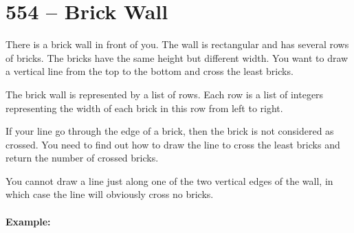 \section{554 -- Brick Wall}

There is a brick wall in front of you. The wall is rectangular and has several rows of bricks. The bricks have the same height but different width. You want to draw a vertical line from the top to the bottom and cross the least bricks.

The brick wall is represented by a list of rows. Each row is a list of integers representing the width of each brick in this row from left to right.

If your line go through the edge of a brick, then the brick is not considered as crossed. You need to find out how to draw the line to cross the least bricks and return the number of crossed bricks.

You cannot draw a line just along one of the two vertical edges of the wall, in which case the line will obviously cross no bricks.

 

\paragraph{Example:}


